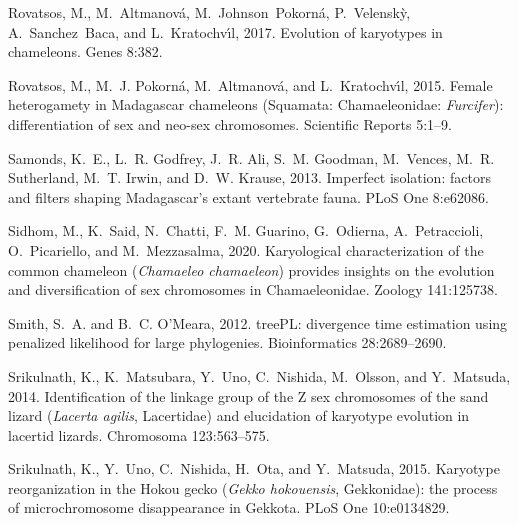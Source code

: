 \documentclass[a4paper, 12pt]{article}
\begin{document}
\begin{thebibliography}{73}
{
Rovatsos, M., M.~Altmanov{\'a}, M.~Johnson~Pokorn{\'a}, P.~Velensk{\`y},
  A.~Sanchez~Baca, and L.~Kratochv{\'\i}l, 2017.
\newblock Evolution of karyotypes in chameleons.
\newblock Genes 8:382.

Rovatsos, M., M.~J. Pokorn{\'a}, M.~Altmanov{\'a}, and L.~Kratochv{\'\i}l,
  2015.
\newblock Female heterogamety in {M}adagascar chameleons ({S}quamata:
  {C}hamaeleonidae: \textit{{F}urcifer}): differentiation of sex and neo-sex
  chromosomes.
\newblock Scientific Reports 5:1--9.

Samonds, K.~E., L.~R. Godfrey, J.~R. Ali, S.~M. Goodman, M.~Vences, M.~R.
  Sutherland, M.~T. Irwin, and D.~W. Krause, 2013.
\newblock Imperfect isolation: factors and filters shaping {M}adagascar's
  extant vertebrate fauna.
\newblock PLoS One 8:e62086.

Sidhom, M., K.~Said, N.~Chatti, F.~M. Guarino, G.~Odierna, A.~Petraccioli,
  O.~Picariello, and M.~Mezzasalma, 2020.
\newblock Karyological characterization of the common chameleon
  (\textit{Chamaeleo chamaeleon}) provides insights on the evolution and
  diversification of sex chromosomes in {C}hamaeleonidae.
\newblock Zoology 141:125738.

Smith, S.~A. and B.~C. O'Meara, 2012.
\newblock tree{PL}: divergence time estimation using penalized likelihood for
  large phylogenies.
\newblock Bioinformatics 28:2689--2690.

Srikulnath, K., K.~Matsubara, Y.~Uno, C.~Nishida, M.~Olsson, and Y.~Matsuda,
  2014.
\newblock Identification of the linkage group of the {Z} sex chromosomes of the
  sand lizard (\textit{Lacerta agilis}, {L}acertidae) and elucidation of
  karyotype evolution in lacertid lizards.
\newblock Chromosoma 123:563--575.

Srikulnath, K., Y.~Uno, C.~Nishida, H.~Ota, and Y.~Matsuda, 2015.
\newblock Karyotype reorganization in the {H}okou gecko (\textit{Gekko
  hokouensis}, {G}ekkonidae): the process of microchromosome disappearance in
  {G}ekkota.
\newblock PLoS One 10:e0134829.

}
\end{thebibliography}
\end{document}

